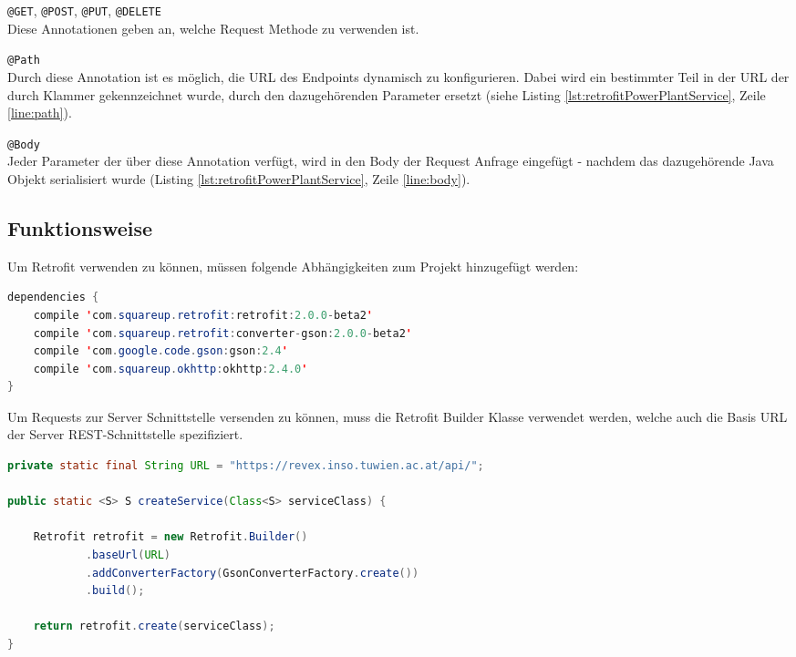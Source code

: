 \begin{list}{-}{}
	\item \texttt{@GET}, \texttt{@POST}, \texttt{@PUT}, \texttt{@DELETE}\\
	Diese Annotationen geben an, welche Request Methode zu verwenden ist.
	\item \texttt{@Path} \\
	Durch diese Annotation ist es möglich, die URL des Endpoints dynamisch zu konfigurieren. Dabei wird ein bestimmter Teil in der URL der durch Klammer gekennzeichnet wurde, durch den dazugehörenden Parameter ersetzt (siehe Listing \ref{lst:retrofitPowerPlantService}, Zeile \ref{line:path}).
	\item \texttt{@Body} \\
	Jeder Parameter der über diese Annotation verfügt, wird in den Body der Request Anfrage eingefügt - nachdem das dazugehörende Java Objekt serialisiert wurde (Listing \ref{lst:retrofitPowerPlantService}, Zeile \ref{line:body}).
\end{list}

\subsection{Funktionsweise}
Um Retrofit verwenden zu können, müssen folgende Abhängigkeiten zum Projekt hinzugefügt werden:

\begin{lstlisting}[language=java, label=dependenciesRetrofit, numbers=none, frame=single]
dependencies {
	compile 'com.squareup.retrofit:retrofit:2.0.0-beta2'
	compile 'com.squareup.retrofit:converter-gson:2.0.0-beta2'
	compile 'com.google.code.gson:gson:2.4'
	compile 'com.squareup.okhttp:okhttp:2.4.0'
}
\end{lstlisting}

Um Requests zur Server Schnittstelle versenden zu können, muss die Retrofit Builder Klasse verwendet werden, welche auch die Basis URL der Server REST-Schnittstelle spezifiziert.

\begin{lstlisting}[language=java, caption={Retrofit Builder},label=retrofitBuilder, frame=single, stringstyle=\color{mymauve}\scriptsize]
private static final String URL = "https://revex.inso.tuwien.ac.at/api/";
 
public static <S> S createService(Class<S> serviceClass) {

	Retrofit retrofit = new Retrofit.Builder()
			.baseUrl(URL)
			.addConverterFactory(GsonConverterFactory.create())
			.build();
	
	return retrofit.create(serviceClass);
}
\end{lstlisting}

